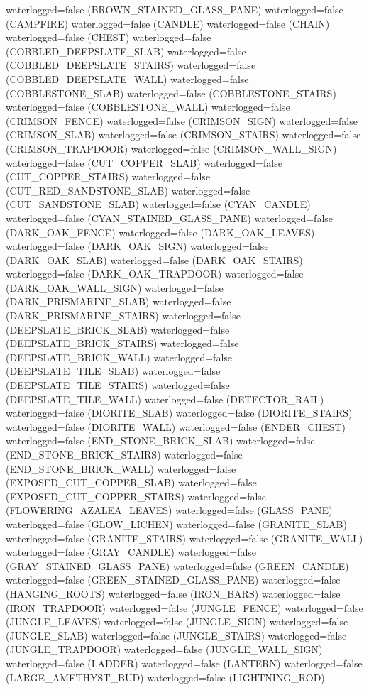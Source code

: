 \documentclass[11pt]{article}
\begin{document}
waterlogged=false (BROWN_STAINED_GLASS_PANE)
waterlogged=false (CAMPFIRE)
waterlogged=false (CANDLE)
waterlogged=false (CHAIN)
waterlogged=false (CHEST)
waterlogged=false (COBBLED_DEEPSLATE_SLAB)
waterlogged=false (COBBLED_DEEPSLATE_STAIRS)
waterlogged=false (COBBLED_DEEPSLATE_WALL)
waterlogged=false (COBBLESTONE_SLAB)
waterlogged=false (COBBLESTONE_STAIRS)
waterlogged=false (COBBLESTONE_WALL)
waterlogged=false (CRIMSON_FENCE)
waterlogged=false (CRIMSON_SIGN)
waterlogged=false (CRIMSON_SLAB)
waterlogged=false (CRIMSON_STAIRS)
waterlogged=false (CRIMSON_TRAPDOOR)
waterlogged=false (CRIMSON_WALL_SIGN)
waterlogged=false (CUT_COPPER_SLAB)
waterlogged=false (CUT_COPPER_STAIRS)
waterlogged=false (CUT_RED_SANDSTONE_SLAB)
waterlogged=false (CUT_SANDSTONE_SLAB)
waterlogged=false (CYAN_CANDLE)
waterlogged=false (CYAN_STAINED_GLASS_PANE)
waterlogged=false (DARK_OAK_FENCE)
waterlogged=false (DARK_OAK_LEAVES)
waterlogged=false (DARK_OAK_SIGN)
waterlogged=false (DARK_OAK_SLAB)
waterlogged=false (DARK_OAK_STAIRS)
waterlogged=false (DARK_OAK_TRAPDOOR)
waterlogged=false (DARK_OAK_WALL_SIGN)
waterlogged=false (DARK_PRISMARINE_SLAB)
waterlogged=false (DARK_PRISMARINE_STAIRS)
waterlogged=false (DEEPSLATE_BRICK_SLAB)
waterlogged=false (DEEPSLATE_BRICK_STAIRS)
waterlogged=false (DEEPSLATE_BRICK_WALL)
waterlogged=false (DEEPSLATE_TILE_SLAB)
waterlogged=false (DEEPSLATE_TILE_STAIRS)
waterlogged=false (DEEPSLATE_TILE_WALL)
waterlogged=false (DETECTOR_RAIL)
waterlogged=false (DIORITE_SLAB)
waterlogged=false (DIORITE_STAIRS)
waterlogged=false (DIORITE_WALL)
waterlogged=false (ENDER_CHEST)
waterlogged=false (END_STONE_BRICK_SLAB)
waterlogged=false (END_STONE_BRICK_STAIRS)
waterlogged=false (END_STONE_BRICK_WALL)
waterlogged=false (EXPOSED_CUT_COPPER_SLAB)
waterlogged=false (EXPOSED_CUT_COPPER_STAIRS)
waterlogged=false (FLOWERING_AZALEA_LEAVES)
waterlogged=false (GLASS_PANE)
waterlogged=false (GLOW_LICHEN)
waterlogged=false (GRANITE_SLAB)
waterlogged=false (GRANITE_STAIRS)
waterlogged=false (GRANITE_WALL)
waterlogged=false (GRAY_CANDLE)
waterlogged=false (GRAY_STAINED_GLASS_PANE)
waterlogged=false (GREEN_CANDLE)
waterlogged=false (GREEN_STAINED_GLASS_PANE)
waterlogged=false (HANGING_ROOTS)
waterlogged=false (IRON_BARS)
waterlogged=false (IRON_TRAPDOOR)
waterlogged=false (JUNGLE_FENCE)
waterlogged=false (JUNGLE_LEAVES)
waterlogged=false (JUNGLE_SIGN)
waterlogged=false (JUNGLE_SLAB)
waterlogged=false (JUNGLE_STAIRS)
waterlogged=false (JUNGLE_TRAPDOOR)
waterlogged=false (JUNGLE_WALL_SIGN)
waterlogged=false (LADDER)
waterlogged=false (LANTERN)
waterlogged=false (LARGE_AMETHYST_BUD)
waterlogged=false (LIGHTNING_ROD)
\end{document}
